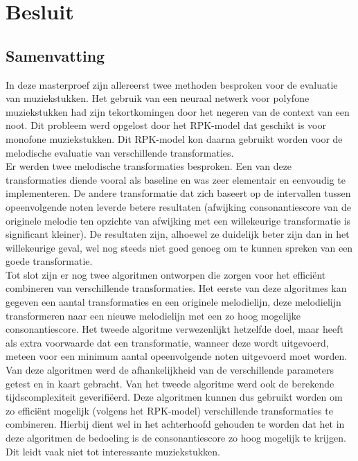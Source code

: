 \chapter{Besluit}
\label{hoofdstuk:B}

\section{Samenvatting}
In deze masterproef zijn allereerst twee methoden besproken voor de evaluatie van muziekstukken. Het gebruik van een neuraal netwerk voor polyfone muziekstukken had zijn tekortkomingen door het negeren van de context van een noot. Dit probleem werd opgelost door het RPK-model dat geschikt is voor monofone muziekstukken. Dit RPK-model kon daarna gebruikt worden voor de melodische evaluatie van verschillende transformaties.\\
Er werden twee melodische transformaties besproken. Een van deze transformaties diende vooral als baseline en was zeer elementair en eenvoudig te implementeren. De andere transformatie dat zich baseert op de intervallen tussen opeenvolgende noten leverde betere resultaten (afwijking consonantiescore van de originele melodie ten opzichte van afwijking met een willekeurige transformatie is significant kleiner). De resultaten zijn, alhoewel ze duidelijk beter zijn dan in het willekeurige geval, wel nog steeds niet goed genoeg om te kunnen spreken van een goede transformatie.\\
Tot slot zijn er nog twee algoritmen ontworpen die zorgen voor het effici\"ent combineren van verschillende transformaties. Het eerste van deze algoritmes kan gegeven een aantal transformaties en een originele melodielijn, deze melodielijn transformeren naar een nieuwe melodielijn met een zo hoog mogelijke consonantiescore. Het tweede algoritme verwezenlijkt hetzelfde doel, maar heeft als extra voorwaarde dat een transformatie, wanneer deze wordt uitgevoerd, meteen voor een minimum aantal opeenvolgende noten uitgevoerd moet worden. Van deze algoritmen werd de afhankelijkheid van de verschillende parameters getest en in kaart gebracht. Van het tweede algoritme werd ook de berekende tijdscomplexiteit geverifi\"eerd. Deze algoritmen kunnen dus gebruikt worden om zo effici\"ent mogelijk (volgens het RPK-model) verschillende transformaties te combineren. Hierbij dient wel in het achterhoofd gehouden te worden dat het in deze algoritmen de bedoeling is de consonantiescore zo hoog mogelijk te krijgen. Dit leidt vaak niet tot interessante muziekstukken.

